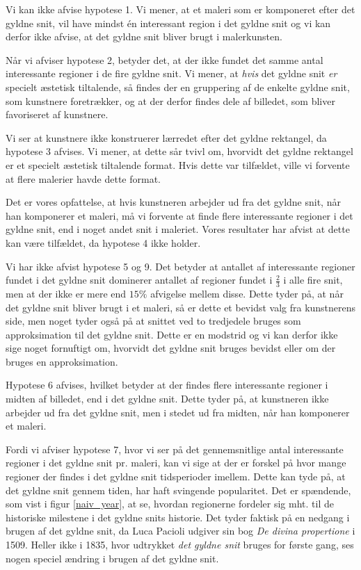 {Vi kan ikke afvise hypotese 1. Vi mener, at et maleri som er komponeret
efter det gyldne snit, vil have mindst én interessant region i det
gyldne snit og vi kan derfor ikke afvise, at det gyldne snit bliver
brugt i malerkunsten.

Når vi afviser hypotese 2, betyder det, at der ikke fundet det samme
antal interessante regioner i de fire gyldne snit. Vi mener, at
\emph{hvis} det gyldne snit \emph{er} specielt æstetisk tiltalende, så
findes der en gruppering af de enkelte gyldne snit, som kunstnere
foretrækker, og at der derfor findes dele af billedet, som bliver
favoriseret af kunstnere.

Vi ser at kunstnere ikke konstruerer lærredet efter det gyldne
rektangel, da hypotese 3 afvises. Vi mener, at dette sår tvivl om,
hvorvidt det gyldne rektangel er et specielt æstetisk tiltalende format.
Hvis dette var tilfældet, ville vi forvente at flere malerier havde
dette format.

Det er vores opfattelse, at hvis kunstneren arbejder ud fra det gyldne
snit, når han komponerer et maleri, må vi forvente at finde flere
interessante regioner i det gyldne snit, end i noget andet snit i
maleriet. Vores resultater har afvist at dette kan være tilfældet, da
hypotese 4 ikke holder.

Vi har ikke afvist hypotese 5 og 9. Det betyder at antallet af
interessante regioner fundet i det gyldne snit dominerer antallet af
regioner fundet i $\frac{2}{3}$ i alle fire snit, men at der ikke er
mere end $15 \%$ afvigelse mellem disse. Dette tyder på, at når det
gyldne snit bliver brugt i et maleri, så er dette et bevidst valg fra
kunstnerens side, men noget tyder også på at snittet ved to tredjedele
bruges som approksimation til det gyldne snit. Dette er en modstrid og
vi kan derfor ikke sige noget fornuftigt om, hvorvidt det gyldne snit
bruges bevidst eller om der bruges en approksimation.

Hypotese 6 afvises, hvilket betyder at der findes flere interessante
regioner i midten af billedet, end i det gyldne snit. Dette tyder på, at
kunstneren ikke arbejder ud fra det gyldne snit, men i stedet ud fra
midten, når han komponerer et maleri.

Fordi vi afviser hypotese 7, hvor vi ser på det gennemsnitlige antal
interessante regioner i det gyldne snit pr. maleri, kan vi sige at der
er forskel på hvor mange regioner der findes i det gyldne snit
tidsperioder imellem.  Dette kan tyde på, at det gyldne snit gennem
tiden, har haft svingende popularitet. Det er spændende, som vist i
figur \ref{naiv_year}, at se, hvordan regionerne fordeler sig mht. til
de historiske milestene i det gyldne snits historie. Det tyder faktisk
på en nedgang i brugen af det gyldne snit, da Luca Pacioli udgiver sin
bog \emph{De divina propertione} i 1509\cite{Markowsky1992}. Heller ikke
i 1835, hvor udtrykket \emph{det gyldne snit} bruges for første
gang\cite{Markowsky1992}, ses nogen speciel ændring i brugen af det
gyldne snit.

}
